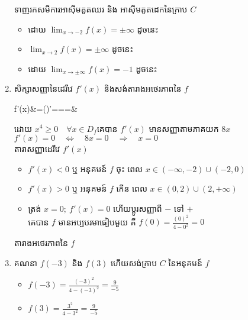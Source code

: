 \documentclass[expologarit]{subfiles}
\begin{document}
\begin{enumerate}[m]
		 ទាញរកសមីការអាស៊ីមតូតឈរ និង អាស៊ីមតូតដេកនៃក្រាប $C$
		 \begin{itemize}
		 \item ដោយ $\lim_{x\to -2}f(x)=\pm\infty$ ដូចនេះ 
		 \item $\lim_{x\to 2}f(x)=\pm\infty$ ដូចនេះ 
		 	 \item ដោយ $\lim_{x\to \pm\infty}f(x)=-1$ ដូចនេះ 
		 \end{itemize}
		\item សិក្សាសញ្ញានៃដេរីវេ $f'(x)$ និងសង់តារាងអថេរភាពនៃ $f$ 
		\begin{flalign*}
		f'(x)&=\left(\right)'===&
		\end{flalign*}
		ដោយ $x^4\geq 0\quad \forall x\in D_f$\quad  គេបាន $f'(x)$ មានសញ្ញាតាមភាគយក $8x$\\
		$f'(x)=0\quad\Leftrightarrow\quad 8x=0\quad\Rightarrow\quad x=0$\\
តារាសញ្ញាដេរីវេ $f'(x)$
\\[0.2cm]
\begin{itemize}
\item $f'(x)<0$ ឬ អនុគមន៍ $f$ ចុះ ពេល $x\in\left(-\infty ,-2\right)\cup\left(-2,0\right)$
\item $f'(x)>0$ ឬ អនុគមន៍ $f$ កើន ពេល $x\in\left(0,2\right)\cup\left(2,+\infty\right)$
\item  ត្រង់ $x=0;\ f'(x)=0$ ហើយប្តូរសញ្ញាពី $-$ ទៅ $+$ \\[0.25cm]
គេបាន $f$ មានអប្បបរមាធៀបមួយ គឺ $f(0)=\frac{(0)^2}{4-0^2}=0$
\end{itemize}
 តារាងអថេរភាពនៃ $f$\\[0.2cm]
		\item គណនា $f(-3)$ និង $f(3)$ ហើយសង់ក្រាប $C$ នៃអនុគមន៍ $f$ 
		\begin{itemize}
		\item $f(-3)=\frac{(-3)^2}{4-(-3)^2}=\frac{9}{-5}$\quad {}\\[0.25cm]
		\item $f(3)=\frac{3^2}{4-3^2}=\frac{9}{-5}$\quad {}
		\end{itemize}
	
		\end{enumerate}
\end{document}
